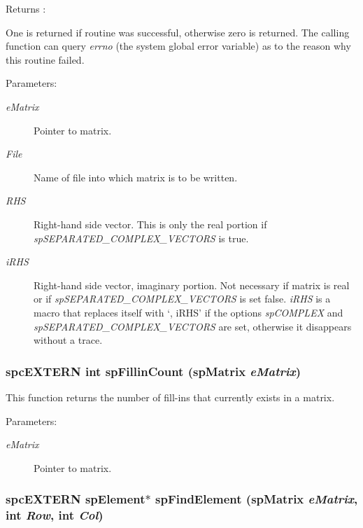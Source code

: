 \begin{Desc}
\item[Returns :]\par
 One is returned if routine was successful, otherwise zero is returned. The calling function can query {\em errno} (the system global error variable) as to the reason why this routine failed.\end{Desc}
\begin{Desc}
\item[Parameters: ]\par
\begin{description}
\item[{\em 
e\-Matrix}]Pointer to matrix. \item[{\em 
File}]Name of file into which matrix is to be written. \item[{\em 
RHS}]Right-hand side vector. This is only the real portion if {\em sp\-SEPARATED\_\-COMPLEX\_\-VECTORS} is true. \item[{\em 
i\-RHS}]Right-hand side vector, imaginary portion. Not necessary if matrix is real or if {\em sp\-SEPARATED\_\-COMPLEX\_\-VECTORS} is set false. {\em i\-RHS} is a macro that replaces itself with `, i\-RHS' if the options {\em sp\-COMPLEX} and {\em sp\-SEPARATED\_\-COMPLEX\_\-VECTORS} are set, otherwise it disappears without a trace. \end{description}
\end{Desc}
\subsubsection{\setlength{\rightskip}{0pt plus 5cm}spc\-EXTERN int sp\-Fillin\-Count ({\bf sp\-Matrix} {\em e\-Matrix})}\label{spMatrix_8h_a33}


This function returns the number of fill-ins that currently exists in a matrix.\begin{Desc}
\item[Parameters: ]\par
\begin{description}
\item[{\em 
e\-Matrix}]Pointer to matrix. \end{description}
\end{Desc}
\subsubsection{\setlength{\rightskip}{0pt plus 5cm}spc\-EXTERN {\bf sp\-Element}$\ast$ sp\-Find\-Element ({\bf sp\-Matrix} {\em e\-Matrix}, int {\em Row}, int {\em Col})}\label{spMatrix_8h_a34}


